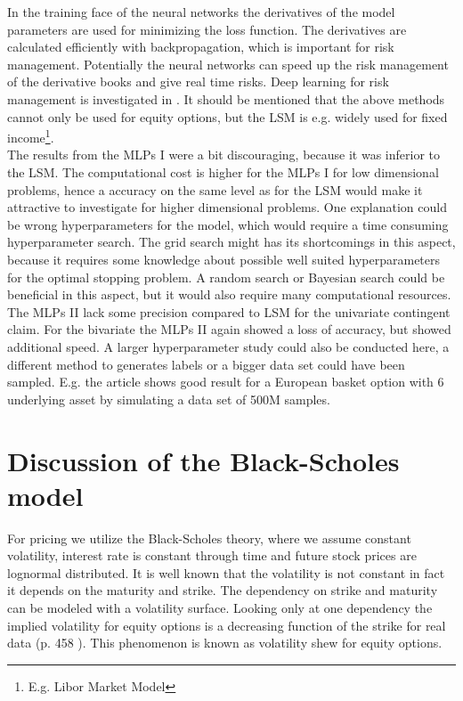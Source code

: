 In the training face of the neural networks the derivatives of the model parameters are used for minimizing the loss function. The derivatives are calculated efficiently with backpropagation, which is important for risk management. Potentially the neural networks can speed up the risk management of the derivative books and give real time risks. Deep learning for risk management is investigated in \parencite{AntoineSavine}. It should be mentioned that the above methods cannot only be used for equity options, but the LSM is e.g. widely used for fixed income\footnote{E.g. Libor Market Model}.\\

The results from the MLPs I were a bit discouraging, because it was inferior to the LSM. The computational cost is higher for the MLPs I for low dimensional problems, hence a accuracy on the same level as for the LSM would make it attractive to investigate for higher dimensional problems. One explanation could be wrong hyperparameters for the model, which would require a time consuming hyperparameter search. The grid search might has its shortcomings in this aspect, because it requires some knowledge about possible well suited hyperparameters for the optimal stopping problem. A random search or Bayesian search could be beneficial in this aspect, but it would also require many computational resources.\\

The MLPs II lack some precision compared to LSM for the univariate contingent claim. For the bivariate the MLPs II again showed a loss of accuracy, but showed additional speed. A larger hyperparameter study could also be conducted here, a different method to generates labels or a bigger data set could have been sampled. E.g. the article \parencite{FergusonRyan2018} shows good result for a European basket option with 6 underlying asset by simulating a data set of 500M samples. 

\section{Discussion of the Black-Scholes model}
For pricing we utilize the Black-Scholes theory, where we assume constant volatility, interest rate is constant through time and future stock prices are lognormal distributed. It is well known that the volatility is not constant in fact it depends on the maturity and strike. The dependency on strike and maturity can be modeled with a volatility surface. Looking only at one dependency the implied volatility for equity options is a decreasing function of the strike for real data (p. 458 \parencite{Hull}). This phenomenon is known as volatility shew for equity options. \\

